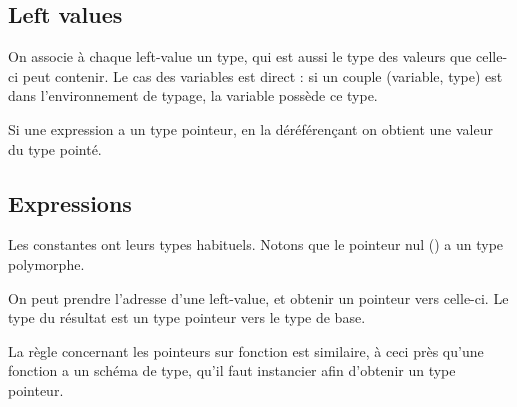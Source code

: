 \subsection{Left values}

On associe à chaque left-value un type, qui est aussi le type des valeurs que
celle-ci peut contenir. Le cas des variables est direct : si un couple
(variable, type) est dans l'environnement de typage, la variable possède ce
type.

\begin{mathpar}
\end{mathpar}

Si une expression a un type pointeur, en la déréférençant on obtient une valeur
du type pointé.

\begin{mathpar}
\end{mathpar}



\subsection{Expressions}

Les constantes ont leurs types habituels. Notons que le pointeur nul (\cNil) a
un type polymorphe.


On peut prendre l'adresse d'une left-value, et obtenir un pointeur vers
celle-ci. Le type du résultat est un type pointeur vers le type de base.

\begin{mathpar}
\end{mathpar}

La règle concernant les pointeurs sur fonction est similaire, à ceci près qu'une
fonction a un schéma de type, qu'il faut instancier afin d'obtenir un type
pointeur.


